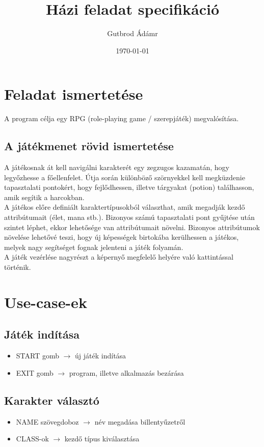 \documentclass[12pt,a4paper]{article}
\title{\bfseries\Large Házi feladat specifikáció}
\author{Gutbrod Ádámr}
\date{\today}
\begin{document}
	\maketitle
	
	\section{Feladat ismertetése}
	A program célja egy RPG (role-playing game / szerepjáték) megvalósítása. \
	
	\subsection{A játékmenet rövid ismertetése}
	A játékosnak át kell navigálni karakterét egy zegzugos kazamatán, hogy legyőzhesse a főellenfelet. 
	Útja során különböző szörnyekkel kell megküzdenie tapasztalati pontokért, hogy fejlődhessen, illetve tárgyakat (potion) találhasson, amik segítik a harcokban. \\
	A játékos előre definiált karaktertípusokból választhat, amik megadják kezdő attribútumait (élet, mana stb.). Bizonyos számú tapasztalati pont gyűjtése után szintet léphet, ekkor lehetősége van attribútumait növelni. Bizonyos attribútumok növelése lehetővé teszi, hogy új képességek birtokába kerülhessen a játékos, melyek nagy segítséget fognak jelenteni a játék folyamán. \\
	A játék vezérlése nagyrészt a képernyő megfelelő helyére való kattintással történik.
	
	
	\section{Use-case-ek}
	\subsection{Játék indítása}
	\begin{itemize}
		\item START gomb $\rightarrow$ új játék indítása
		\item EXIT gomb $\rightarrow$ program, illetve alkalmazás bezárása
	\end{itemize}
	
	\subsection{Karakter választó}
	\begin{itemize}
		\item NAME szövegdoboz $\rightarrow$ név megadása billentyűzetről
		\item CLASS-ok $\rightarrow$ kezdő típus kiválasztása
	\end{itemize}
	
\end{document}
